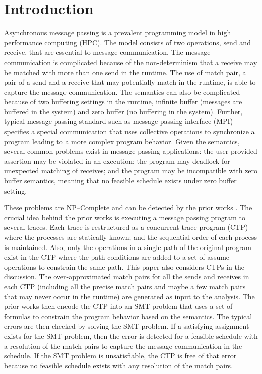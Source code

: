  \section{Introduction}
Asynchronous message passing is a prevalent programming model in high performance computing (HPC). The model consists of two operations, send and receive, that are essential to message communication. The message communication is complicated because of the non-determinism that a receive may be matched with more than one send in the runtime. The use of match pair, a pair of a send and a receive that may potentially match in the runtime, is able to capture the message communication.
The semantics can also be complicated because of two buffering settings in the runtime, infinite buffer (messages are buffered in the system) and zero buffer (no buffering in the system). Further, typical message passing standard such as message passing interface (MPI) specifies a special communication that uses collective operations to synchronize a program leading to a more complex program behavior. 
Given the semantics, several common problems exist in message passing applications: the user-provided assertion may be violated in an execution; the program may deadlock for unexpected matching of receives; and the program may be incompatible with zero buffer semantics, meaning that no feasible schedule exists under zero buffer setting. 

These problems are NP--Complete and can be detected by the prior works \cite{DBLP:conf/kbse/HuangMM13,HuangNFM15,HuangDeadlock}. The crucial idea behind the prior works is executing a message passing program to several traces. Each trace is restructured as a concurrent trace program (CTP) where the processes are statically known; and the sequential order of each process is maintained. Also, only the operations in a single path of the original program exist in the CTP where the path conditions are added to a set of assume operations to constrain the same path. This paper also considers CTPs in the discussion. The over-approximated match pairs for all the sends and receives in each CTP (including all the precise match pairs and maybe a few match pairs that may never occur in the runtime) are generated as input to the analysis. The prior works then encode the CTP into an SMT problem that uses a set of formulas to constrain the program behavior based on the semantics. The typical errors are then checked by solving the SMT problem. If a satisfying assignment exists for the SMT problem, then the error is detected for a feasible schedule with a resolution of the match pairs to capture the message communication in the schedule. If the SMT problem is unsatisfiable, the CTP is free of that error because no feasible schedule exists with any resolution of the match pairs. 

